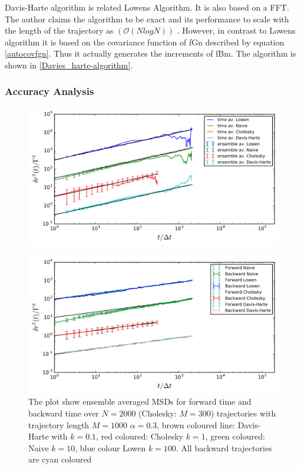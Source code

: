 \documentclass[
  a4paper,BCOR10mm,oneside,
  headsepline,footsepline,%
  fleqn,openbib
]{scrbook}
\begin{document}
Davis-Harte algorithm \cite{DAVIES1987} is related Lowens Algorithm. It is also based on a FFT. The author claims the algorithm to be exact and its performance to scale with the length of the trajectory as $(\mathcal{O}(NlogN))$ . However, in contrast to Lowens algorithm it is based on the covariance function of fGn described by equation \cref{autocovfgn}. Thus it actually generates the increments of fBm. The  algorithm is shown in \cref{Davies_harte-algorithm}. 
\subsubsection{Accuracy Analysis}
\begin{figure}[h!]
  \centering
  \includegraphics[width=\textwidth]{./data/timevsensambenew.png}
  \captionsetup{width=\linewidth}
  \label{fig:4}
\end{figure}
\begin{figure}[h!]
\centering
\includegraphics[width=\textwidth]{./data/changeintimenew.png}
\caption{The plot show ensemble averaged MSDs for forward time and backward time over $N=2000$ (Cholesky: $M=300$) trajectories with trajectory length $M=1000$  $\alpha =0.3$,  brown coloured line: Davis-Harte with $k=0.1$, red coloured: Cholesky $k=1$, green coloured: Naive $k=10$, blue colour Lowen $k=100$. All backward trajectories are cyan coloured}
\label{changeintime}
\end{figure} 
\end{document}
